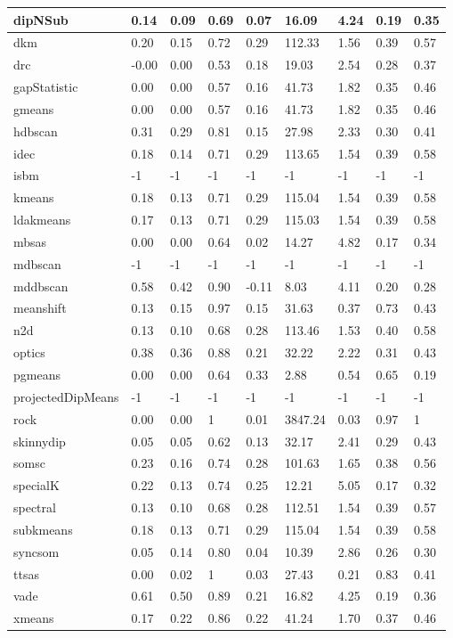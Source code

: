 \begin{table}[H]
\begin{tabular}{|l|l|l|l|l|l|l|l|l|}
\hline
dipNSub & 0.14 & 0.09 & 0.69 & 0.07 & 16.09 & 4.24 & 0.19 & 0.35 \\
\hline
dkm & 0.20 & 0.15 & 0.72 & 0.29 & 112.33 & 1.56 & 0.39 & 0.57 \\
\hline
drc & -0.00 & 0.00 & 0.53 & 0.18 & 19.03 & 2.54 & 0.28 & 0.37 \\
\hline
gapStatistic & 0.00 & 0.00 & 0.57 & 0.16 & 41.73 & 1.82 & 0.35 & 0.46 \\
\hline
gmeans & 0.00 & 0.00 & 0.57 & 0.16 & 41.73 & 1.82 & 0.35 & 0.46 \\
\hline
hdbscan & 0.31 & 0.29 & 0.81 & 0.15 & 27.98 & 2.33 & 0.30 & 0.41 \\
\hline
idec & 0.18 & 0.14 & 0.71 & 0.29 & 113.65 & 1.54 & 0.39 & 0.58 \\
\hline
isbm & -1 & -1 & -1 & -1 & -1 & -1 & -1 & -1 \\
\hline
kmeans & 0.18 & 0.13 & 0.71 & 0.29 & 115.04 & 1.54 & 0.39 & 0.58 \\
\hline
ldakmeans & 0.17 & 0.13 & 0.71 & 0.29 & 115.03 & 1.54 & 0.39 & 0.58 \\
\hline
mbsas & 0.00 & 0.00 & 0.64 & 0.02 & 14.27 & 4.82 & 0.17 & 0.34 \\
\hline
mdbscan & -1 & -1 & -1 & -1 & -1 & -1 & -1 & -1 \\
\hline
mddbscan & 0.58 & 0.42 & 0.90 & -0.11 & 8.03 & 4.11 & 0.20 & 0.28 \\
\hline
meanshift & 0.13 & 0.15 & 0.97 & 0.15 & 31.63 & 0.37 & 0.73 & 0.43 \\
\hline
n2d & 0.13 & 0.10 & 0.68 & 0.28 & 113.46 & 1.53 & 0.40 & 0.58 \\
\hline
optics & 0.38 & 0.36 & 0.88 & 0.21 & 32.22 & 2.22 & 0.31 & 0.43 \\
\hline
pgmeans & 0.00 & 0.00 & 0.64 & 0.33 & 2.88 & 0.54 & 0.65 & 0.19 \\
\hline
projectedDipMeans & -1 & -1 & -1 & -1 & -1 & -1 & -1 & -1 \\
\hline
rock & 0.00 & 0.00 & 1 & 0.01 & 3847.24 & 0.03 & 0.97 & 1 \\
\hline
skinnydip & 0.05 & 0.05 & 0.62 & 0.13 & 32.17 & 2.41 & 0.29 & 0.43 \\
\hline
somsc & 0.23 & 0.16 & 0.74 & 0.28 & 101.63 & 1.65 & 0.38 & 0.56 \\
\hline
specialK & 0.22 & 0.13 & 0.74 & 0.25 & 12.21 & 5.05 & 0.17 & 0.32 \\
\hline
spectral & 0.13 & 0.10 & 0.68 & 0.28 & 112.51 & 1.54 & 0.39 & 0.57 \\
\hline
subkmeans & 0.18 & 0.13 & 0.71 & 0.29 & 115.04 & 1.54 & 0.39 & 0.58 \\
\hline
syncsom & 0.05 & 0.14 & 0.80 & 0.04 & 10.39 & 2.86 & 0.26 & 0.30 \\
\hline
ttsas & 0.00 & 0.02 & 1 & 0.03 & 27.43 & 0.21 & 0.83 & 0.41 \\
\hline
vade & 0.61 & 0.50 & 0.89 & 0.21 & 16.82 & 4.25 & 0.19 & 0.36 \\
\hline
xmeans & 0.17 & 0.22 & 0.86 & 0.22 & 41.24 & 1.70 & 0.37 & 0.46 \\
\hline
\end{tabular}
\end{table}
